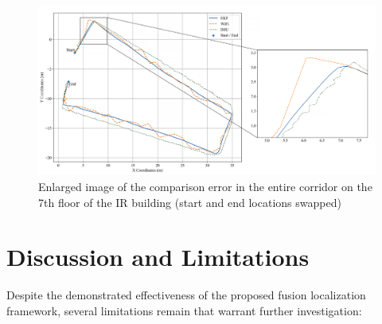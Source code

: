 \documentclass[12pt,a4paper]{article}
\numberwithin{equation}{section}
\begin{document}
\begin{figure}[H]
    \centering
    \includegraphics[width=\linewidth]{Amplification images/wifi/full_circle_inverse.png}
    \caption{Enlarged image of the comparison error in the entire corridor on the 7th floor of the IR building (start and end locations swapped)}
    \label{fig:error_7_inverse}
\end{figure}
\section{Discussion and Limitations}
Despite the demonstrated effectiveness of the proposed fusion localization framework, several limitations remain that warrant further investigation:
\end{document}
